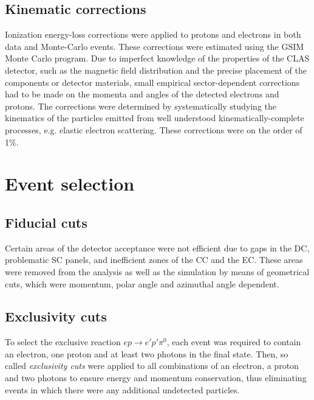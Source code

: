 \documentclass[prc,floatfix,twocolumn,superscriptaddress,letter]{revtex4}
\begin{document}
\subsection{Kinematic corrections}
Ionization energy-loss corrections were applied to  protons and electrons in both data and Monte-Carlo events. These corrections were estimated using the GSIM Monte Carlo program.
Due to imperfect knowledge of the properties of the CLAS detector, such as the magnetic field distribution and the precise  placement of the components or detector materials, small empirical sector-dependent corrections had to be made on the momenta and angles of the detected electrons and protons. The corrections were determined by systematically studying the kinematics of the particles emitted from well understood kinematically-complete processes, e.g. elastic electron scattering. These corrections were on the order of 1\%.




\section{Event selection}



\subsection{Fiducial cuts}
Certain areas of the detector acceptance were not efficient due to  gaps in the DC,
problematic SC panels, and inefficient zones of the CC and the EC. These areas were removed from the analysis as well as the simulation by means of geometrical cuts,  which were momentum, polar angle and azimuthal angle dependent.



\subsection{Exclusivity cuts}
\label{sect:exclusivity_cuts}

To select the exclusive reaction $ep\rightarrow e'p'\pi^0$, each event was required to contain an electron, one proton and at least two photons in the final state. Then,  so called {\it exclusivity cuts} were applied to all combinations of an electron,  a proton and two  photons  to ensure energy and momentum conservation, thus eliminating events in which there were any additional undetected particles.
\end{document}
